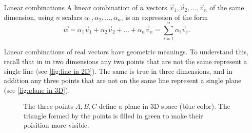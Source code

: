 \begin{definition}{Linear combinations}{}
	A linear combination of $n$ vectors $\vec{v}_{1}, \vec{v}_{2}, \dots, \vec{v}_{n}$ of the same dimension, using $n$ scalars $\alpha_{1},\alpha_{2},\dots,\alpha_{n}$, is an expression of the form
	\begin{equation}
		\vec{w} = \alpha_{1}\vec{v}_{1} + \alpha_{2}\vec{v}_{2} + \dots + \alpha_{n}\vec{v}_{n} = \sum\limits_{i=1}^{n}\alpha_{i}\vec{v}_{i}.
		\label{eq:linear combination}
	\end{equation}
\end{definition}

Linear combinations of real vectors have geometric meanings. To understand this, recall that in in two dimensions any two points that are not the same represent a single line (see \autoref{fig:line in 2D}). The same is true in three dimensions, and in addition any three points that are not on the same line represent a single plane (see \autoref{fig:plane in 3D}).

\begin{figure}[h]
	\centering
	\caption{The three points $A,B,C$ define a plane in 3D space (blue color). The triangle formed by the points is filled in green to make their poisition more visible.}
	\label{fig:plane in 3D}
\end{figure}

\Blindtext
